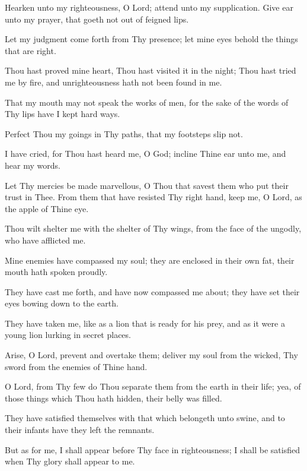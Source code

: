 Hearken unto my righteousness, O Lord; attend unto my supplication. Give ear unto my prayer, that goeth not out of feigned lips.

Let my judgment come forth from Thy presence; let mine eyes behold the things that are right.

Thou hast proved mine heart, Thou hast visited it in the night; Thou hast tried me by fire, and unrighteousness hath not been found in me.

That my mouth may not speak the works of men, for the sake of the words of Thy lips have I kept hard ways.

Perfect Thou my goings in Thy paths, that my footsteps slip not.

I have cried, for Thou hast heard me, O God; incline Thine ear unto me, and hear my words.

Let Thy mercies be made marvellous, O Thou that savest them who put their trust in Thee. From them that have resisted Thy right hand, keep me, O Lord, as the apple of Thine eye.

Thou wilt shelter me with the shelter of Thy wings, from the face of the ungodly, who have afflicted me.

Mine enemies have compassed my soul; they are enclosed in their own fat, their mouth hath spoken proudly.

They have cast me forth, and have now compassed me about; they have set their eyes bowing down to the earth.

They have taken me, like as a lion that is ready for his prey, and as it were a young lion lurking in secret places.

Arise, O Lord, prevent and overtake them; deliver my soul from the wicked, Thy sword from the enemies of Thine hand.

O Lord, from Thy few do Thou separate them from the earth in their life; yea, of those things which Thou hath hidden, their belly was filled.

They have satisfied themselves with that which belongeth unto swine, and to their infants have they left the remnants.

But as for me, I shall appear before Thy face in righteousness; I shall be satisfied when Thy glory shall appear to me.
